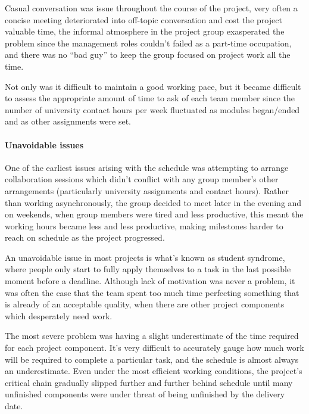 Casual conversation was issue throughout the course of the project, very often a concise meeting deteriorated into off-topic conversation and cost the project valuable time, the informal atmosphere in the project group exasperated the problem since the management roles couldn't failed as a part-time occupation, and there was no ``bad guy'' to keep the group focused on project work all the time.

Not only was it difficult to maintain a good working pace, but it became difficult to assess the appropriate amount of time to ask of each team member since the number of university contact hours per week fluctuated as modules began/ended and as other assignments were set.

\paragraph{Unavoidable issues}
One of the earliest issues arising with the schedule was attempting to arrange collaboration sessions which didn't conflict with any group member's other arrangements (particularly university assignments and contact hours). Rather than working asynchronously, the group decided to meet later in the evening and on weekends, when group members were tired and less productive, this meant the working hours became less and less productive, making milestones harder to reach on schedule as the project progressed.

An unavoidable issue in most projects is what's known as student syndrome, where people only start to fully apply themselves to a task in the last possible moment before a deadline. \cite{maylor2010} Although lack of motivation was never a problem, it was often the case that the team spent too much time perfecting something that is already of an acceptable quality, when there are other project components which desperately need work.

The most severe problem was having a slight underestimate of the time required for each project component. It's very difficult to accurately gauge how much work will be required to complete a particular task, and the schedule is almost always an underestimate. Even under the most efficient working conditions, the project's critical chain gradually slipped further and further behind schedule until many unfinished components were under threat of being unfinished by the delivery date. \cite{goldratt}

